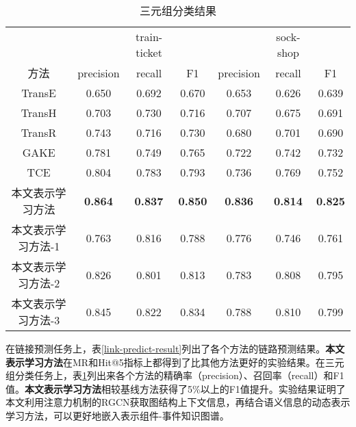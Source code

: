 \begin{table}[htbp]
    \caption{三元组分类结果}
    \centering
    \label{triple-class-result}
    \begin{tabular}{ccccccc}
    \toprule[2pt]
               &                & train-ticket   &                &                & sock-shop      &                \\
    方法         & precision      & recall         & F1             & precision      & recall         & F1             \\ \midrule[2pt]
    TransE     & 0.650          & 0.692          & 0.670          & 0.653          & 0.626          & 0.639          \\
    TransH     & 0.703          & 0.730          & 0.716          & 0.707          & 0.675          & 0.691          \\
    TransR     & 0.743          & 0.716          & 0.730          & 0.680          & 0.701          & 0.690          \\
    GAKE       & 0.781          & 0.749          & 0.765          & 0.722          & 0.742          & 0.732          \\
    TCE        & 0.804          & 0.783          & 0.793          & 0.736          & 0.769          & 0.752          \\
    本文表示学习方法   & \textbf{0.864} & \textbf{0.837} & \textbf{0.850} & \textbf{0.836} & \textbf{0.814} & \textbf{0.825} \\
    本文表示学习方法-1 & 0.763          & 0.816          & 0.788          & 0.776          & 0.746          & 0.761          \\
    本文表示学习方法-2 & 0.826          & 0.801          & 0.813          & 0.783          & 0.808          & 0.795          \\
    本文表示学习方法-3  & 0.845          & 0.822          & 0.834          & 0.788          & 0.810           & 0.799          \\ \bottomrule[2pt]
    \end{tabular}
\end{table}
在链接预测任务上，表\ref{link-predict-result}列出了各个方法的链路预测结果。\textbf{本文表示学习方法}在MR和Hit@5指标上都得到了比其他方法更好的实验结果。在三元组分类任务上，表\ref{triple-class-result}列出来各个方法的精确率（precision）、召回率（recall）和F1值。\textbf{本文表示学习方法}相较基线方法获得了5\%以上的F1值提升。实验结果证明了本文利用注意力机制的RGCN获取图结构上下文信息，再结合语义信息的动态表示学习方法，可以更好地嵌入表示组件-事件知识图谱。

